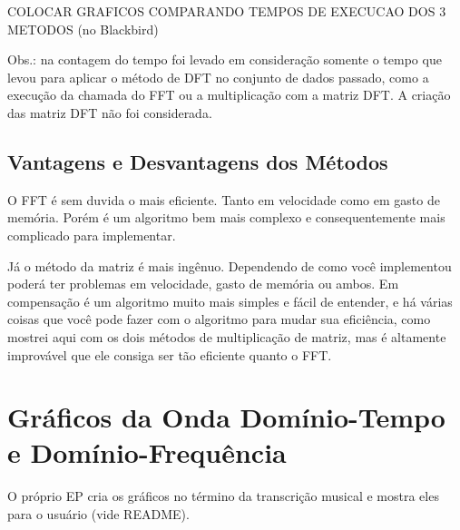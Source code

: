 \documentclass[a4paper,11pt]{article}
\begin{document}
COLOCAR GRAFICOS COMPARANDO TEMPOS DE EXECUCAO DOS 3 METODOS (no Blackbird)

Obs.: na contagem do tempo foi levado em consideração somente o tempo que levou para aplicar o método de DFT no conjunto de dados
passado, como a execução da chamada do FFT ou a multiplicação com a matriz DFT. A criação das matriz DFT não foi considerada.

\subsection{Vantagens e Desvantagens dos Métodos}

O FFT é sem duvida o mais eficiente. Tanto em velocidade como em gasto de memória. Porém é um algoritmo bem mais complexo e
consequentemente mais complicado para implementar.

Já o método da matriz é mais ingênuo. Dependendo de como você implementou poderá ter problemas em velocidade, gasto de memória
ou ambos. Em compensação é um algoritmo muito mais simples e fácil de entender, e há várias coisas que você pode fazer com o
algoritmo para mudar sua eficiência, como mostrei aqui com os dois métodos de multiplicação de matriz, mas é altamente improvável
que ele consiga ser tão eficiente quanto o FFT.

\section{Gráficos da Onda Domínio-Tempo e Domínio-Frequência}

O próprio EP cria os gráficos no término da transcrição musical e mostra eles para o usuário (vide README).
\end{document}
